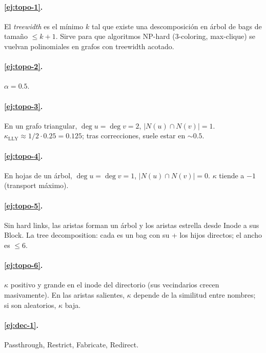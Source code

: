 \paragraph{\ref{ej:topo-1}.} El \emph{treewidth} es el mínimo
$k$ tal que existe una descomposición en árbol de bags de tamaño $\leq
k+1$. Sirve para que algoritmos NP-hard (3-coloring, max-clique) se
vuelvan polinomiales en grafos con treewidth acotado.

\paragraph{\ref{ej:topo-2}.} $\alpha = 0.5$.

\paragraph{\ref{ej:topo-3}.} En un grafo triangular, $\deg u = \deg v
= 2$, $|N(u) \cap N(v)| = 1$. $\kappa_{\mathrm{LLY}} \approx
1/2 \cdot 0.25 = 0.125$; tras correcciones, suele estar en $\sim 0.5$.

\paragraph{\ref{ej:topo-4}.} En hojas de un árbol, $\deg u = \deg v =
1$, $|N(u) \cap N(v)| = 0$. $\kappa$ tiende a $-1$ (transport máximo).

\paragraph{\ref{ej:topo-5}.} Sin hard links, las aristas \econtains{}
forman un árbol y los \epointsto{} aristas estrella desde Inode a sus
Block. La tree decomposition: cada \Dir{} es un bag con su \Inode{}
+ los hijos directos; el ancho es $\leq 6$.

\paragraph{\ref{ej:topo-6}.} $\kappa$ positivo y grande en el inode
del directorio (sus vecindarios crecen masivamente). En las aristas
\econtains{} salientes, $\kappa$ depende de la similitud entre nombres;
si son aleatorios, $\kappa$ baja.

\paragraph{\ref{ej:dec-1}.} Passthrough, Restrict, Fabricate, Redirect.

